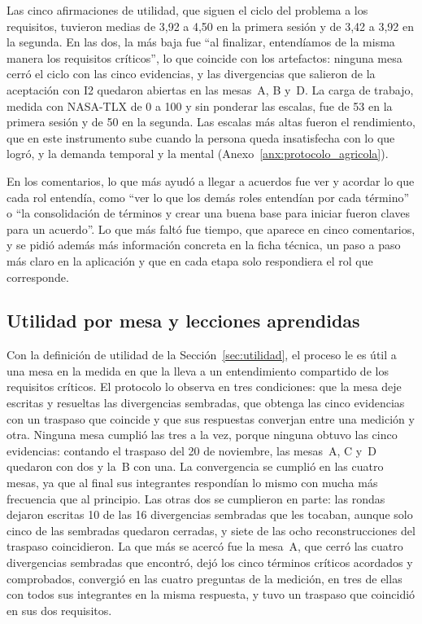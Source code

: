 \documentclass[12pt,letterpaper,oneside]{report}
\begin{document}
Las cinco afirmaciones de utilidad, que siguen el ciclo del problema a los
requisitos, tuvieron medias de 3,92 a 4,50 en la primera sesión y de 3,42 a 3,92
en la segunda. En las dos, la más baja fue ``al finalizar, entendíamos de la
misma manera los requisitos críticos'', lo que coincide con los artefactos:
ninguna mesa cerró el ciclo con las cinco evidencias, y las divergencias que
salieron de la aceptación con I2 quedaron abiertas en las mesas~A, B y~D. La
carga de trabajo, medida con NASA-TLX de 0 a 100 y sin ponderar las escalas, fue
de 53 en la primera sesión y de 50 en la segunda. Las escalas más altas fueron
el rendimiento, que en este instrumento sube cuando la persona queda
insatisfecha con lo que logró, y la demanda temporal y la mental
(Anexo~\ref{anx:protocolo_agricola}).

En los comentarios, lo que más ayudó a llegar a acuerdos fue ver y acordar lo
que cada rol entendía, como ``ver lo que los demás roles entendían por cada
término'' o ``la consolidación de términos y crear una buena base para iniciar
fueron claves para un acuerdo''. Lo que más faltó fue tiempo, que aparece en
cinco comentarios, y se pidió además más información concreta en la ficha
técnica, un paso a paso más claro en la aplicación y que en cada etapa solo
respondiera el rol que corresponde.

\subsection{Utilidad por mesa y lecciones aprendidas}
Con la definición de utilidad de la Sección~\ref{sec:utilidad}, el proceso le
es útil a una mesa en la medida en que la lleva a un entendimiento compartido de
los requisitos críticos. El protocolo lo observa en tres condiciones: que la
mesa deje escritas y resueltas las divergencias sembradas, que obtenga las cinco
evidencias con un traspaso que coincide y que sus respuestas converjan entre una
medición y otra. Ninguna mesa cumplió las tres a la vez, porque ninguna obtuvo
las cinco evidencias: contando el traspaso del 20 de noviembre, las mesas~A, C
y~D quedaron con dos y la~B con una. La convergencia se cumplió en las cuatro
mesas, ya que al final sus integrantes respondían lo mismo con mucha más
frecuencia que al principio. Las otras dos se cumplieron en parte: las rondas
dejaron escritas 10 de las 16 divergencias sembradas que les tocaban, aunque
solo cinco de las sembradas quedaron cerradas, y siete de las ocho
reconstrucciones del traspaso coincidieron. La que más se acercó fue la mesa~A, que cerró las cuatro divergencias sembradas que encontró,
dejó los cinco términos críticos acordados y comprobados, convergió en las
cuatro preguntas de la medición, en tres de ellas con todos sus integrantes en
la misma respuesta, y tuvo un traspaso que coincidió en sus dos requisitos.
\end{document}
